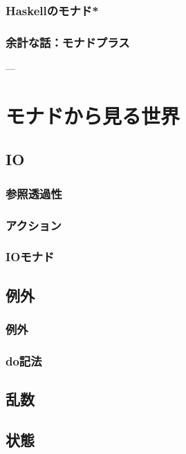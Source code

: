 \documentclass[twocolumn]{jsbook}
\begin{document}
\section{Haskellのモナド*}

\section{余計な話：モナドプラス}


---

\part{モナドから見る世界}

\chapter{IO}

\section{参照透過性}

\section{アクション}

\section{IOモナド}

\chapter{例外}

\section{例外}

\section{do記法}

\chapter{乱数}

\chapter{状態}
\end{document}
